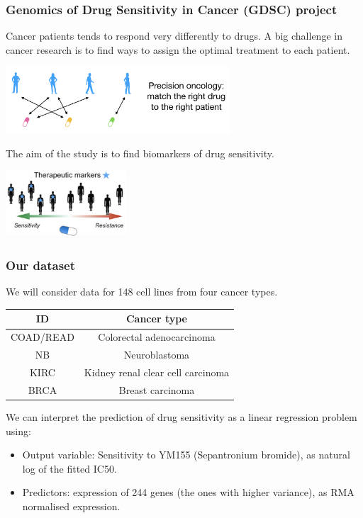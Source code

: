 \documentclass[notes]{beamer}          %
\begin{document}
\begin{frame}
\frametitle{Genomics of Drug Sensitivity in Cancer (GDSC) project}
Cancer patients tends to respond very differently to drugs. A big challenge in cancer research 
is to find ways to assign the optimal treatment to each patient.

\begin{center}
\includegraphics[height=2.5cm]{../figures/week_2_linear_models/precision_oncology.png}
\end{center}

The aim of the study is to find biomarkers of drug sensitivity.

\begin{center}
\includegraphics[height=2.5cm]{../figures/week_2_linear_models/GDSC_study_aim.png}
\end{center}

\end{frame}

\begin{frame}
\frametitle{Our dataset}

We will consider data for 148 cell lines from four cancer types.

\begin{center}
\begin{tabular}{ |c|c| } 
 \hline
 ID & Cancer type \\
 \hline
 COAD/READ & Colorectal adenocarcinoma \\ 
 NB & Neuroblastoma \\ 
 KIRC & Kidney renal clear cell carcinoma \\ 
 BRCA & Breast carcinoma \\
 \hline
\end{tabular}
\end{center}

We can interpret the prediction of drug sensitivity as a linear regression problem using:

\begin{itemize}
    \item Output variable: Sensitivity to YM155 (Sepantronium bromide), as natural log of the fitted IC50. 
    \item Predictors: expression of 244 genes (the ones with higher variance), as RMA normalised expression.
\end{itemize}

\end{frame}
\end{document}
